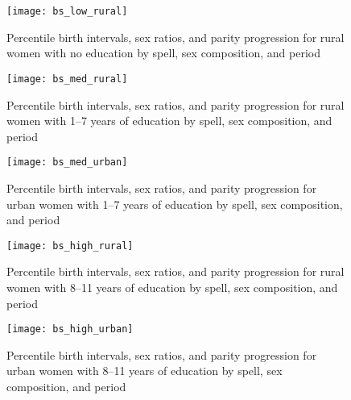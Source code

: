 \documentclass[12pt,letterpaper]{article}
\begin{document}
\captionsetup[figure]{skip = -16pt}

\begin{figure}
\centering
\texttt{[image: bs\_low\_rural]}
\caption{Percentile birth intervals, sex ratios, and parity progression  
for rural women with no education by spell, sex composition, and period}
\label{fig:spacing_low_rural}
\end{figure}


\begin{figure}
\centering
\texttt{[image: bs\_med\_rural]}
\caption{Percentile birth intervals, sex ratios, and parity progression  
for rural women with 1--7 years of education by spell, sex composition, and period}
\label{fig:spacing_med_rural}
\end{figure}

\begin{figure}
\centering
\texttt{[image: bs\_med\_urban]}
\caption{Percentile birth intervals, sex ratios, and parity progression  
for urban women with 1--7 years of education by spell, sex composition, and period}
\label{fig:spacing_med_urban}
\end{figure}

\begin{figure}
\centering
\texttt{[image: bs\_high\_rural]}
\caption{Percentile birth intervals, sex ratios, and parity progression  
for rural women with 8--11 years of education by spell, sex composition, and period}
\label{fig:spacing_high_rural}
\end{figure}

\begin{figure}
\centering
\texttt{[image: bs\_high\_urban]}
\caption{Percentile birth intervals, sex ratios, and parity progression  
for urban women with 8--11 years of education by spell, sex composition, and period}
\label{fig:spacing_high_urban}
\end{figure}
\end{document}

